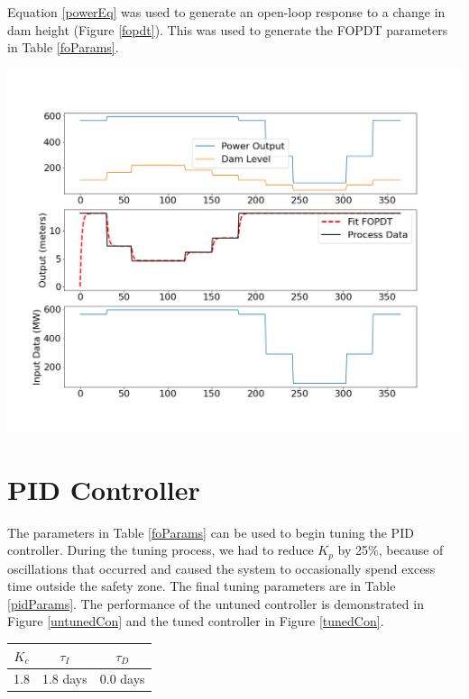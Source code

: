 \documentclass{article}
\begin{document}
\begin{multicols*}{2}
        Equation \ref{powerEq} was used to generate an open-loop response to a change in dam height (Figure \ref{fopdt}). This was used to generate the FOPDT parameters in Table \ref{foParams}.
        
        \vspace{5mm}
        \noindent
        \begin{minipage}{0.49\textwidth}
            \includegraphics[width=\textwidth]{FOPDT_big.png}
            \label{fopdt}
        \end{minipage}
            
        \section{PID Controller}
    
        The parameters in Table \ref{foParams} can be used to begin tuning the PID controller.  During the tuning process, we had to reduce $K_p$ by 25\%, because of oscillations that occurred and caused the system to occasionally spend excess time outside the safety zone. The final tuning parameters are in Table \ref{pidParams}. The performance of the untuned controller is demonstrated in Figure \ref{untunedCon} and the tuned controller in Figure \ref{tunedCon}.

        \begin{minipage}{0.9\columnwidth}
            \label{pidParams}
            \vspace{-1ex}
            \begin{center}
            \begin{tabular}{ccc}
                    \toprule
                    $K_c$ & $\tau_I$ & $\tau_D$ \\
                    \midrule
                     1.8 & 1.8 days & 0.0 days
                \end{tabular}
            \end{center}
        \end{minipage}


\end{multicols*}
\end{document}
